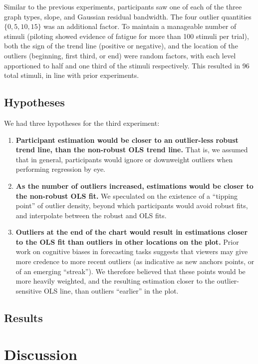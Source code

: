 \documentclass{sigchi}
\begin{document}
Similar to the previous experiments, participants saw one of each of the three graph types, slope, and Gaussian residual bandwidth. The four outlier quantities $\{0,5,10,15\}$ was an additional factor. To maintain a manageable number of stimuli (piloting showed evidence of fatigue for more than 100 stimuli per trial), both the sign of the trend line (positive or negative), and the location of the outliers (beginning, first third, or end) were random factors, with each level apportioned to half and one third of the stimuli respectively. This resulted in 96 total stimuli, in line with prior experiments.

\subsection{Hypotheses}

We had three hypotheses for the third experiment:
\begin{enumerate}
	\item \textbf{Participant estimation would be closer to an outlier-less robust trend line, than the non-robust OLS trend line.} That is, we assumed that in general, participants would ignore or downweight outliers when performing regression by eye.
	\item \textbf{As the number of outliers increased, estimations would be closer to the non-robust OLS fit.} We speculated on the existence of a ``tipping point'' of outlier density, beyond which participants would avoid robust fits, and interpolate between the robust and OLS fits.
	\item \textbf{Outliers at the end of the chart would result in estimations closer to the OLS fit than outliers in other locations on the plot.} Prior work on cognitive biases in forecasting tasks suggests that viewers may give more credence to more recent outliers (as indicative as new anchors points, or of an emerging ``streak''). We therefore believed that these points would be more heavily weighted, and the resulting estimation closer to the outlier-sensitive OLS line, than outliers ``earlier'' in the plot.
\end{enumerate}
\subsection{Results}

\section{Discussion}
\end{document}

